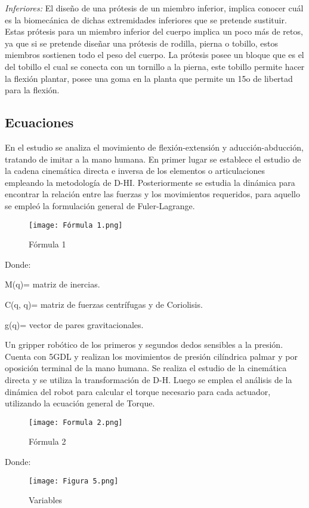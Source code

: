 \documentclass{article}
\begin{document}
\textit{Inferiores:} El diseño de una prótesis de un miembro inferior, implica conocer cuál es la biomecánica de dichas extremidades inferiores que se pretende sustituir. Estas prótesis para un miembro inferior del cuerpo implica un poco más de retos, ya que si se pretende diseñar una prótesis de rodilla, pierna o tobillo, estos miembros sostienen todo el peso del cuerpo.
La prótesis posee un bloque que es el del tobillo el cual se conecta con un tornillo a la pierna, este tobillo permite hacer la flexión plantar, posee una goma en la planta que permite un 15o de libertad para la flexión.

\subsection{Ecuaciones}

En el estudio se analiza el movimiento de flexión-extensión y aducción-abducción, tratando de imitar a la mano humana.
En primer lugar se establece el estudio de la cadena cinemática directa e inversa de los elementos o articulaciones empleando la metodología de D-HI\cite{6}. Posteriormente se estudia la dinámica para encontrar la relación entre las fuerzas y los movimientos requeridos, para aquello se empleó la formulación general de Fuler-Lagrange.
\begin{figure} [htp]%
    \centering
    \texttt{[image: Fórmula 1.png]} %
    \caption{Fórmula 1}
    \label{grafica}
\end{figure}
\newpage
Donde:

M(q)= matriz de inercias.

C(q, q)= matriz de fuerzas centrífugas y de Coriolisis.

g(q)= vector de pares gravitacionales.

Un gripper robótico de los primeros y segundos dedos sensibles a la presión. Cuenta con 5GDL y realizan los movimientos de presión cilíndrica palmar y por oposición terminal de la mano humana. Se realiza el estudio de la cinemática directa y se utiliza la transformación de D-H. Luego se emplea el análisis de la dinámica del robot para calcular el torque necesario para cada actuador, utilizando la ecuación  general de Torque.
\begin{figure} [htp]%
    \centering
    \texttt{[image: Formula 2.png]} %
    \caption{Fórmula 2}
    \label{grafica}
\end{figure}

Donde:
\begin{figure} [htp]%
    \centering
    \texttt{[image: Figura 5.png]} %
    \caption{Variables}
    \label{grafica}
\end{figure}
\end{document}
